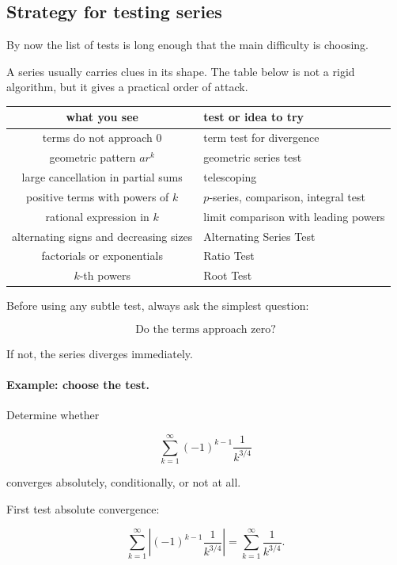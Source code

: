 \subsection{Strategy for testing series}
\label{subsec:strategy-for-testing-series}

By now the list of tests is long enough that the main difficulty is choosing.

A series usually carries clues in its shape.  The table below is not a rigid algorithm, but
it gives a practical order of attack.

\begin{center}
\begin{tabular}{c|l}
\textbf{what you see} & \textbf{test or idea to try} \\ \hline
terms do not approach \(0\) & term test for divergence \\[3pt]
geometric pattern \(ar^k\) & geometric series test \\[3pt]
large cancellation in partial sums & telescoping \\[3pt]
positive terms with powers of \(k\) & \(p\)-series, comparison, integral test \\[3pt]
rational expression in \(k\) & limit comparison with leading powers \\[3pt]
alternating signs and decreasing sizes & Alternating Series Test \\[3pt]
factorials or exponentials & Ratio Test \\[3pt]
\(k\)-th powers & Root Test
\end{tabular}
\end{center}

Before using any subtle test, always ask the simplest question:

\[
\boxed{
\text{Do the terms approach zero?}
}
\]

If not, the series diverges immediately.

\paragraph{Example: choose the test.}
Determine whether

\[
\sum_{k=1}^{\infty}(-1)^{k-1}\frac1{k^{3/4}}
\]

converges absolutely, conditionally, or not at all.

First test absolute convergence:

\[
\sum_{k=1}^{\infty}\left|(-1)^{k-1}\frac1{k^{3/4}}\right|
=
\sum_{k=1}^{\infty}\frac1{k^{3/4}}.
\]

